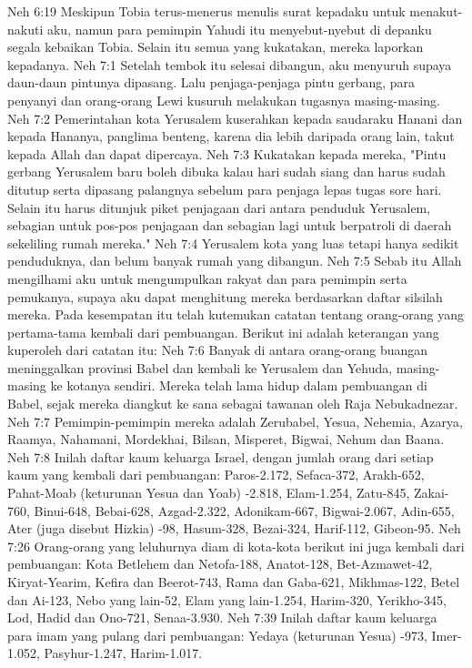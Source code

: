 Neh 6:19  Meskipun Tobia terus-menerus menulis surat kepadaku untuk menakut-nakuti aku, namun para pemimpin Yahudi itu menyebut-nyebut di depanku segala kebaikan Tobia. Selain itu semua yang kukatakan, mereka laporkan kepadanya.
Neh 7:1  Setelah tembok itu selesai dibangun, aku menyuruh supaya daun-daun pintunya dipasang. Lalu penjaga-penjaga pintu gerbang, para penyanyi dan orang-orang Lewi kusuruh melakukan tugasnya masing-masing.
Neh 7:2  Pemerintahan kota Yerusalem kuserahkan kepada saudaraku Hanani dan kepada Hananya, panglima benteng, karena dia lebih daripada orang lain, takut kepada Allah dan dapat dipercaya.
Neh 7:3  Kukatakan kepada mereka, "Pintu gerbang Yerusalem baru boleh dibuka kalau hari sudah siang dan harus sudah ditutup serta dipasang palangnya sebelum para penjaga lepas tugas sore hari. Selain itu harus ditunjuk piket penjagaan dari antara penduduk Yerusalem, sebagian untuk pos-pos penjagaan dan sebagian lagi untuk berpatroli di daerah sekeliling rumah mereka."
Neh 7:4  Yerusalem kota yang luas tetapi hanya sedikit penduduknya, dan belum banyak rumah yang dibangun.
Neh 7:5  Sebab itu Allah mengilhami aku untuk mengumpulkan rakyat dan para pemimpin serta pemukanya, supaya aku dapat menghitung mereka berdasarkan daftar silsilah mereka. Pada kesempatan itu telah kutemukan catatan tentang orang-orang yang pertama-tama kembali dari pembuangan. Berikut ini adalah keterangan yang kuperoleh dari catatan itu:
Neh 7:6  Banyak di antara orang-orang buangan meninggalkan provinsi Babel dan kembali ke Yerusalem dan Yehuda, masing-masing ke kotanya sendiri. Mereka telah lama hidup dalam pembuangan di Babel, sejak mereka diangkut ke sana sebagai tawanan oleh Raja Nebukadnezar.
Neh 7:7  Pemimpin-pemimpin mereka adalah Zerubabel, Yesua, Nehemia, Azarya, Raamya, Nahamani, Mordekhai, Bilsan, Misperet, Bigwai, Nehum dan Baana.
Neh 7:8  Inilah daftar kaum keluarga Israel, dengan jumlah orang dari setiap kaum yang kembali dari pembuangan: Paros-2.172, Sefaca-372, Arakh-652, Pahat-Moab (keturunan Yesua dan Yoab) -2.818, Elam-1.254, Zatu-845, Zakai-760, Binui-648, Bebai-628, Azgad-2.322, Adonikam-667, Bigwai-2.067, Adin-655, Ater (juga disebut Hizkia) -98, Hasum-328, Bezai-324, Harif-112, Gibeon-95.
Neh 7:26  Orang-orang yang leluhurnya diam di kota-kota berikut ini juga kembali dari pembuangan: Kota Betlehem dan Netofa-188, Anatot-128, Bet-Azmawet-42, Kiryat-Yearim, Kefira dan Beerot-743, Rama dan Gaba-621, Mikhmas-122, Betel dan Ai-123, Nebo yang lain-52, Elam yang lain-1.254, Harim-320, Yerikho-345, Lod, Hadid dan Ono-721, Senaa-3.930.
Neh 7:39  Inilah daftar kaum keluarga para imam yang pulang dari pembuangan: Yedaya (keturunan Yesua) -973, Imer-1.052, Pasyhur-1.247, Harim-1.017.
